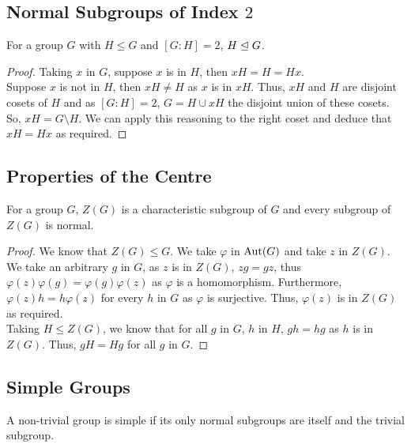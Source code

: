 \subsection{Normal Subgroups of Index $2$}

For a group $G$ with $H \leq G$ and $[G : H] = 2$, $H \trianglelefteq G$.

\begin{proof}
    Taking $x$ in $G$, suppose $x$ is in $H$, then $xH = H = Hx$.
    \\[\baselineskip]
    Suppose $x$ is not in $H$, then $xH \neq H$ as $x$ is in $xH$.
    Thus, $xH$ and $H$ are disjoint cosets of $H$ and as $[G : H] = 2$, 
    $G = H \cup xH$ the disjoint union of these cosets. So, 
    $xH = G \setminus H$. We can apply this reasoning to the right coset
    and deduce that $xH = Hx$ as required.
\end{proof}

\subsection{Properties of the Centre}

For a group $G$, $Z(G)$ is a characteristic subgroup of $G$ and every
subgroup of $Z(G)$ is normal.

\begin{proof}
    We know that $Z(G) \leq G$. We take $\varphi$ in $\operatorname{Aut}(G)$ and take $z$
    in $Z(G)$. We take an arbitrary $g$ in $G$, as $z$ is in $Z(G)$, 
    $zg = gz$, thus $\varphi(z)\varphi(g) = \varphi(g)\varphi(z)$ as 
    $\varphi$ is a homomorphism. Furthermore, $\varphi(z)h = h\varphi(z)$
    for every $h$ in $G$ as $\varphi$ is surjective. Thus, $\varphi(z)$
    is in $Z(G)$ as required.
    \\[\baselineskip]
    Taking $H \leq Z(G)$, we know that for all $g$ in $G$, $h$ in $H$,
    $gh = hg$ as $h$ is in $Z(G)$. Thus, $gH = Hg$ for all $g$ in $G$.
\end{proof}

\subsection{Simple Groups}

A non-trivial group is simple if its only normal subgroups are itself 
and the trivial subgroup.
